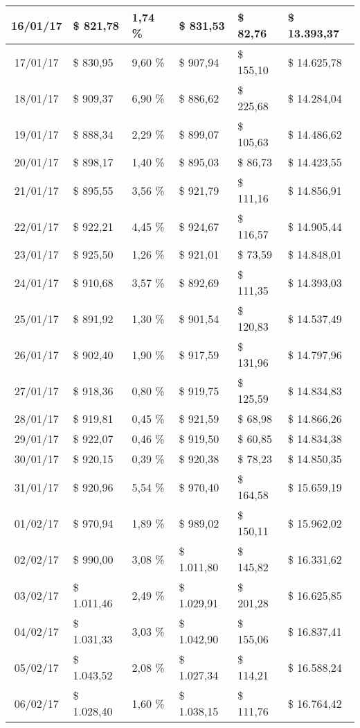 \begin{small}
\begin{longtable}{|c|l|l|l|l|l|}
16/01/17 & \$ 821,78 & 1,74 \% & \$ 831,53 & \$ 82,76 & \$ 13.393,37 \\ \hline
17/01/17 & \$ 830,95 & 9,60 \% & \$ 907,94 & \$ 155,10 & \$ 14.625,78 \\ \hline
18/01/17 & \$ 909,37 & 6,90 \% & \$ 886,62 & \$ 225,68 & \$ 14.284,04 \\ \hline
19/01/17 & \$ 888,34 & 2,29 \% & \$ 899,07 & \$ 105,63 & \$ 14.486,62 \\ \hline
20/01/17 & \$ 898,17 & 1,40 \% & \$ 895,03 & \$ 86,73 & \$ 14.423,55 \\ \hline
21/01/17 & \$ 895,55 & 3,56 \% & \$ 921,79 & \$ 111,16 & \$ 14.856,91 \\ \hline
22/01/17 & \$ 922,21 & 4,45 \% & \$ 924,67 & \$ 116,57 & \$ 14.905,44 \\ \hline
23/01/17 & \$ 925,50 & 1,26 \% & \$ 921,01 & \$ 73,59 & \$ 14.848,01 \\ \hline
24/01/17 & \$ 910,68 & 3,57 \% & \$ 892,69 & \$ 111,35 & \$ 14.393,03 \\ \hline
25/01/17 & \$ 891,92 & 1,30 \% & \$ 901,54 & \$ 120,83 & \$ 14.537,49 \\ \hline
26/01/17 & \$ 902,40 & 1,90 \% & \$ 917,59 & \$ 131,96 & \$ 14.797,96 \\ \hline
27/01/17 & \$ 918,36 & 0,80 \% & \$ 919,75 & \$ 125,59 & \$ 14.834,83 \\ \hline
28/01/17 & \$ 919,81 & 0,45 \% & \$ 921,59 & \$ 68,98 & \$ 14.866,26 \\ \hline
29/01/17 & \$ 922,07 & 0,46 \% & \$ 919,50 & \$ 60,85 & \$ 14.834,38 \\ \hline
30/01/17 & \$ 920,15 & 0,39 \% & \$ 920,38 & \$ 78,23 & \$ 14.850,35 \\ \hline
31/01/17 & \$ 920,96 & 5,54 \% & \$ 970,40 & \$ 164,58 & \$ 15.659,19 \\ \hline
01/02/17 & \$ 970,94 & 1,89 \% & \$ 989,02 & \$ 150,11 & \$ 15.962,02 \\ \hline
02/02/17 & \$ 990,00 & 3,08 \% & \$ 1.011,80 & \$ 145,82 & \$ 16.331,62 \\ \hline
03/02/17 & \$ 1.011,46 & 2,49 \% & \$ 1.029,91 & \$ 201,28 & \$ 16.625,85 \\ \hline
04/02/17 & \$ 1.031,33 & 3,03 \% & \$ 1.042,90 & \$ 155,06 & \$ 16.837,41 \\ \hline
05/02/17 & \$ 1.043,52 & 2,08 \% & \$ 1.027,34 & \$ 114,21 & \$ 16.588,24 \\ \hline
06/02/17 & \$ 1.028,40 & 1,60 \% & \$ 1.038,15 & \$ 111,76 & \$ 16.764,42 \\ \hline

\end{longtable}
\end{small}
